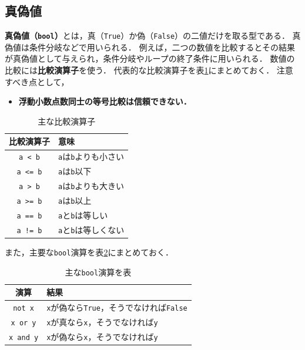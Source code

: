 \documentclass[a4paper,12pt]{jsarticle}
\begin{document}
\subsection{真偽値}

{\bf 真偽値（\texttt{bool}）}とは，真（\texttt{True}）か偽（\texttt{False}）の二値だけを取る型である．
真偽値は条件分岐などで用いられる．
例えば，二つの数値を比較するとその結果が真偽値として与えられ，条件分岐やループの終了条件に用いられる．
数値の比較には{\bf 比較演算子}を使う．
代表的な比較演算子を表\ref{tab:comparison}にまとめておく．
注意すべき点として，
\begin{itemize}
    \item {\bf 浮動小数点数同士の等号比較は信頼できない．}
\end{itemize}

\begin{table}[H]
    \centering
    \caption{主な比較演算子}
    \begin{tabular}{c|l}
        \hline
        比較演算子 & 意味 \\
        \hline\hline
        \texttt{a < b} & \texttt{a}は\texttt{b}よりも小さい \\
        \texttt{a <= b} & \texttt{a}は\texttt{b}以下 \\
        \texttt{a > b} & \texttt{a}は\texttt{b}よりも大きい \\
        \texttt{a >= b} & \texttt{a}は\texttt{b}以上 \\
        \texttt{a == b} & \texttt{a}と\texttt{b}は等しい \\
        \texttt{a != b} & \texttt{a}と\texttt{b}は等しくない \\
        \hline
    \end{tabular}
    \label{tab:comparison}
\end{table}

また，主要な\texttt{bool}演算を表\ref{tab:bool}にまとめておく．
\begin{table}[H]
    \centering
    \caption{主な\texttt{bool}演算を表}
    \begin{tabular}{c|l}
        \hline
        演算 & 結果 \\
        \hline\hline
        \texttt{not x} & \texttt{x}が偽なら\texttt{True}，そうでなければ\texttt{False} \\
        \texttt{x or y} & \texttt{x}が真なら\texttt{x}，そうでなければ\texttt{y} \\
        \texttt{x and y} & \texttt{x}が偽なら\texttt{x}，そうでなければ\texttt{y} \\
        \hline
    \end{tabular}
    \label{tab:bool}
\end{table}
\end{document}
